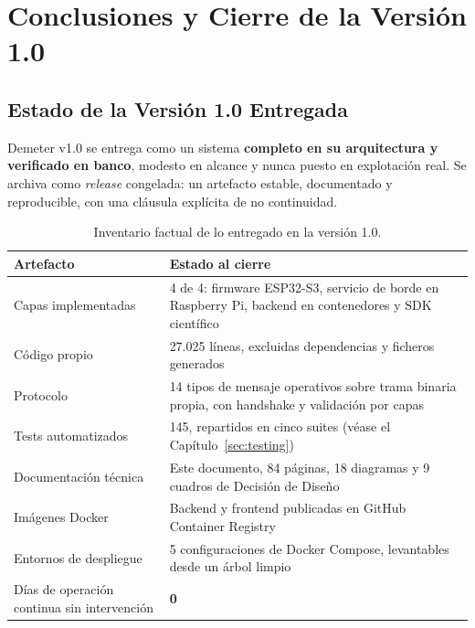 
\chapter{Conclusiones y Cierre de la Versión 1.0}
\label{sec:conclusiones}

\section{Estado de la Versión 1.0 Entregada}

Demeter v1.0 se entrega como un sistema \textbf{completo en su arquitectura y
verificado en banco}, modesto en alcance y nunca puesto en explotación real. Se
archiva como \textit{release} congelada: un artefacto estable, documentado y
reproducible, con una cláusula explícita de no continuidad.

\begin{table}[H]
    \centering
    \caption{Inventario factual de lo entregado en la versión 1.0.}
    \label{tab:inventario_v1}
    \begin{tabular}{lp{8cm}}
        \toprule
        \textbf{Artefacto} & \textbf{Estado al cierre} \\
        \midrule
        Capas implementadas & 4 de 4: firmware ESP32-S3, servicio de borde
        en Raspberry Pi, backend en contenedores y SDK científico \\
        Código propio & 27.025 líneas, excluidas dependencias y ficheros
        generados \\
        Protocolo & 14 tipos de mensaje operativos sobre trama binaria
        propia, con handshake y validación por capas \\
        Tests automatizados & 145, repartidos en cinco suites (véase el
        Capítulo~\ref{sec:testing}) \\
        Documentación técnica & Este documento, 84 páginas, 18 diagramas y
        9 cuadros de Decisión de Diseño \\
        Imágenes Docker & Backend y frontend publicadas en GitHub Container
        Registry \\
        Entornos de despliegue & 5 configuraciones de Docker Compose,
        levantables desde un árbol limpio \\
        Días de operación continua sin intervención & \textbf{0} \\
        \bottomrule
    \end{tabular}
\end{table}

